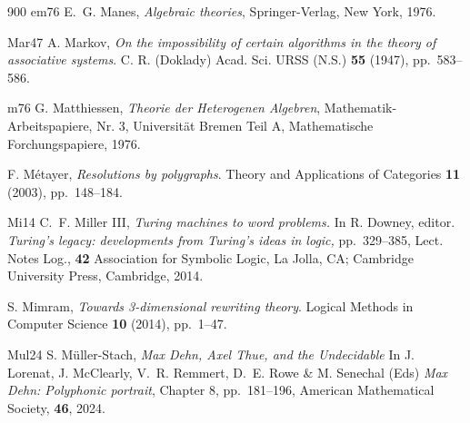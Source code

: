 \begin{thebibliography}{900}
\bibitem%
{em76} E.~G. Manes, \emph{Algebraic theories}, Springer-Verlag, New York, 1976.

\bibitem%
{Mar47} A. Markov, \emph{On the impossibility of certain algorithms in the theory of associative systems}. C. R. (Doklady) Acad. Sci. URSS (N.S.) \textbf{55} (1947), pp.~583--586.


\bibitem%
{m76} G. Matthiessen, \emph{Theorie der {H}eterogenen {A}lgebren}, Mathematik-{A}rbeitspapiere, Nr. 3, Universit\"{a}t Bremen Teil A, Mathematische Forchungspapiere, 1976.


F. M\'{e}tayer, \emph{Resolutions by polygraphs}. Theory and Applications of Categories \textbf{11} (2003), pp.~148--184.



\bibitem%
{Mi14} C.~F. Miller\! III, \emph{Turing machines to word problems.} In R. Downey, editor. \emph{Turing's legacy: developments from Turing's ideas in logic,} pp.~329--385, Lect. Notes Log., \textbf{42} Association for Symbolic Logic, La Jolla, CA; Cambridge University Press, Cambridge, 2014.

S. Mimram, \emph{Towards 3-dimensional rewriting theory}. Logical Methods in Computer Science \textbf{10} (2014), pp.~1--47.

%

\bibitem%
{Mul24} S. M\"{u}ller-Stach, \emph{Max Dehn, Axel Thue, and the Undecidable} In J. Lorenat, J. McClearly, V.~R. Remmert, D.~E. Rowe \& M. Senechal (Eds) \emph{Max Dehn: Polyphonic portrait}, Chapter 8, pp.~181--196, American Mathematical Society, \textbf{46}, 2024.


\end{thebibliography}
